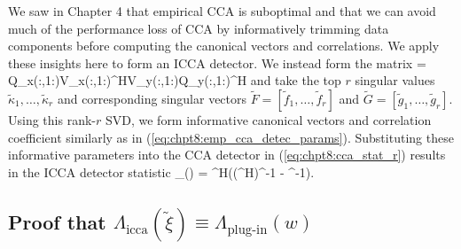 We saw in Chapter 4 that empirical
CCA is suboptimal and that we can avoid much of the performance loss of CCA by
informatively trimming data components before computing the canonical vectors and
correlations. We apply these insights here to form an ICCA detector. We instead form the
matrix 
\be
\Ciccahat = Q_x(:,1:\kx)V_x(:,1:\kx)^HV_y(:,1:\ky)Q_y(:,1:\ky)^H
\ee
and take the top $r$ singular values $\widetilde{\kappa}_1,\dots,\widetilde{\kappa}_r$
and corresponding singular vectors $\widetilde{F}=[\widetilde{f}_1,\dots,\widetilde{f}_r]$ and 
$\widetilde{G}=[\widetilde{g}_1,\dots,\widetilde{g}_r]$. Using this rank-$r$ SVD, we form
informative 
canonical vectors and correlation coefficient similarly as in
(\ref{eq:chpt8:emp_cca_detec_params}). Substituting these informative parameters into the CCA
detector in (\ref{eq:chpt8:cca_stat_r}) results in the ICCA detector statistic  
\beq\label{eq:chpt8:icca_plugin_stat} 
\Lambda_{}(\widetilde{\xi}) =
\widetilde{\xi}^H\left(\left(^H\right)^{-1} -
  ^{-1}\right)\widetilde{\xi}.   
\eeq

\subsection{Proof that $\Lambda_{\text{icca}}(\widetilde{\xi})
  \equiv\Lambda_{\text{plug-in}}(w)$}

